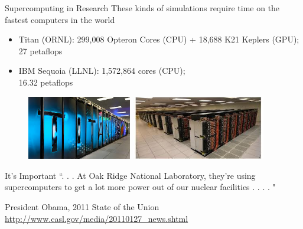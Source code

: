 \documentclass[xcolor=x11names,compress]{beamer}
\renewcommand{\(}{\begin{columns}}
\renewcommand{\)}{\end{columns}}
\newcommand{\<}[1]{\begin{column}{#1}}
\renewcommand{\>}{\end{column}}
\begin{document}
\begin{frame}{Supercomputing in Research}
These kinds of simulations require time on the fastest computers in the world
\begin{itemize}
\item \textcolor{RawSienna}{Titan} (ORNL): 299,008 Opteron Cores (CPU) + 18,688 K21 Keplers (GPU); \textcolor{dgreen}{27 petaflops}
\item \textcolor{RawSienna}{IBM Sequoia} (LLNL): 1,572,864 cores (CPU); \\\textcolor{dgreen}{16.32 petaflops}
\end{itemize}
\begin{figure}
\includegraphics[height=1.1in,clip]{../figs/Titan}
\hfill
\includegraphics[height=1.1in,clip]{../figs/Sequoia}
\end{figure}
\end{frame}

\begin{frame}{It's Important}
``. . . At Oak Ridge National Laboratory, they're using supercomputers to get a lot more power out of our nuclear facilities . . . . "

\vspace*{0.5 in}
President Obama, 2011 State of the Union\\
\href{http://www.casl.gov/media/20110127\_news.shtml}{http://www.casl.gov/media/20110127\_news.shtml}
\end{frame}
\end{document}
